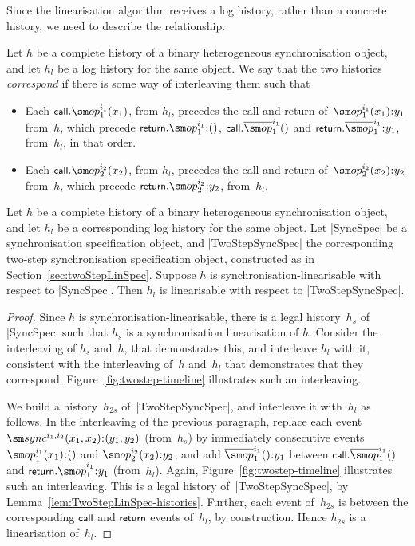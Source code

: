 Since the linearisation algorithm receives  a log history, rather
than a concrete history, we need to describe the relationship.  
%
\begin{definition}
Let $h$ be a complete history of a binary heterogeneous synchronisation
object, and let $h_l$ be a log history for the same object.  We say that the
two histories \emph{correspond} if there is some way of interleaving them such
that
%
\begin{itemize}
\item Each $\call.\op_1^{i_1}(x_1)$, from $h_l$, precedes the call and return
  of~$\op_1^{i_1}(x_1)\::y_1$ from~$h$, which precede $\return.\op_1^{i_1} \::
  ()$, $\call.\overline{\op}_1^{i_1}()$ and $\return.\overline{\op}_1^{i_1}
  \:: y_1$, from~$h_l$, in that order.

\item Each $\call.\op_2^{i_2}(x_2)$, from $h_l$, precedes the call and return
  of~$\op_2^{i_2}(x_2)\::y_2$ from~$h$, which precede $\return.\op_2^{i_2}
  \:: y_2$, from~$h_l$.
\end{itemize}
\end{definition}

\begin{prop}
\label{prop:twostep-testing}
Let $h$ be a complete history of a binary heterogeneous synchronisation
object, and let $h_l$ be a corresponding log history for the same object.  Let
|SyncSpec| be a synchronisation specification object, and |TwoStepSyncSpec|
the corresponding two-step synchronisation specification object, constructed
as in Section~\ref{sec:twoStepLinSpec}.  Suppose $h$ is
synchronisation-linearisable with respect to |SyncSpec|.  Then $h_l$ is
linearisable with respect to |TwoStepSyncSpec|.
\end{prop}
%
\begin{proof}
Since $h$ is synchronisation-linearisable, there is a legal history~$h_s$ of
|SyncSpec| such that $h_s$ is a synchronisation linearisation of $h$.
Consider the interleaving of $h_s$ and~$h$, that demonstrates this, and
interleave $h_l$ with it, consistent with the interleaving of~$h$ and~$h_l$
that demonstrates that they correspond.  Figure~\ref{fig:twostep-timeline}
illustrates such an interleaving.

We build a history~$h_{2s}$ of~|TwoStepSyncSpec|, and interleave it with~$h_l$
as follows.  In the interleaving of the previous paragraph, replace each event
$\sync^{i_1,i_2}(x_1,x_2)\::(y_1,y_2)$ (from~$h_s$) by immediately consecutive
events~$\op_1^{i_1}(x_1)\::()$ and $\op_2^{i_2}(x_2)\::y_2$, and add
$\overline{\op}_1^{i_1}()\::y_1$ between $\call.\overline{\op}_1^{i_1}()$ and
$\return.\overline{\op}_1^{i_1} \:: y_1$ (from~$h_l$).  Again,
Figure~\ref{fig:twostep-timeline} illustrates such an interleaving.  This is a
legal history of~|TwoStepSyncSpec|, by
Lemma~\ref{lem:TwoStepLinSpec-histories}.  Further, each event of~$h_{2s}$ is
between the corresponding $\mbox{\sf{\small call}}$ and $\mbox{\sf{\small return}}$ events of~$h_l$, by
construction.  Hence $h_{2s}$ is a linearisation of~$h_l$.
\end{proof}

